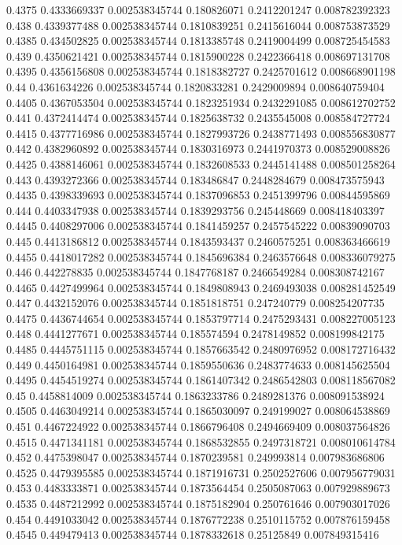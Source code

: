 {0.4375 0.4333669337 0.002538345744 0.180826071 0.2412201247 0.008782392323
0.438 0.4339377488 0.002538345744 0.1810839251 0.2415616044 0.008753873529
0.4385 0.434502825 0.002538345744 0.1813385748 0.2419004499 0.008725454583
0.439 0.4350621421 0.002538345744 0.1815900228 0.2422366418 0.008697131708
0.4395 0.4356156808 0.002538345744 0.1818382727 0.2425701612 0.008668901198
0.44 0.4361634226 0.002538345744 0.1820833281 0.2429009894 0.008640759404
0.4405 0.4367053504 0.002538345744 0.1823251934 0.2432291085 0.008612702752
0.441 0.4372414474 0.002538345744 0.1825638732 0.2435545008 0.008584727724
0.4415 0.4377716986 0.002538345744 0.1827993726 0.2438771493 0.008556830877
0.442 0.4382960892 0.002538345744 0.1830316973 0.2441970373 0.008529008826
0.4425 0.4388146061 0.002538345744 0.1832608533 0.2445141488 0.008501258264
0.443 0.4393272366 0.002538345744 0.183486847 0.2448284679 0.008473575943
0.4435 0.4398339693 0.002538345744 0.1837096853 0.2451399796 0.00844595869
0.444 0.4403347938 0.002538345744 0.1839293756 0.245448669 0.008418403397
0.4445 0.4408297006 0.002538345744 0.1841459257 0.2457545222 0.00839090703
0.445 0.4413186812 0.002538345744 0.1843593437 0.2460575251 0.008363466619
0.4455 0.4418017282 0.002538345744 0.1845696384 0.2463576648 0.008336079275
0.446 0.442278835 0.002538345744 0.1847768187 0.2466549284 0.008308742167
0.4465 0.4427499964 0.002538345744 0.1849808943 0.2469493038 0.008281452549
0.447 0.4432152076 0.002538345744 0.1851818751 0.247240779 0.008254207735
0.4475 0.4436744654 0.002538345744 0.1853797714 0.2475293431 0.008227005123
0.448 0.4441277671 0.002538345744 0.185574594 0.2478149852 0.008199842175
0.4485 0.4445751115 0.002538345744 0.1857663542 0.2480976952 0.008172716432
0.449 0.4450164981 0.002538345744 0.1859550636 0.2483774633 0.008145625504
0.4495 0.4454519274 0.002538345744 0.1861407342 0.2486542803 0.008118567082
0.45 0.4458814009 0.002538345744 0.1863233786 0.2489281376 0.008091538924
0.4505 0.4463049214 0.002538345744 0.1865030097 0.249199027 0.008064538869
0.451 0.4467224922 0.002538345744 0.1866796408 0.2494669409 0.008037564826
0.4515 0.4471341181 0.002538345744 0.1868532855 0.2497318721 0.008010614784
0.452 0.4475398047 0.002538345744 0.1870239581 0.249993814 0.007983686806
0.4525 0.4479395585 0.002538345744 0.1871916731 0.2502527606 0.007956779031
0.453 0.4483333871 0.002538345744 0.1873564454 0.2505087063 0.007929889673
0.4535 0.4487212992 0.002538345744 0.1875182904 0.250761646 0.007903017026
0.454 0.4491033042 0.002538345744 0.1876772238 0.2510115752 0.007876159458
0.4545 0.449479413 0.002538345744 0.1878332618 0.25125849 0.007849315416
}
